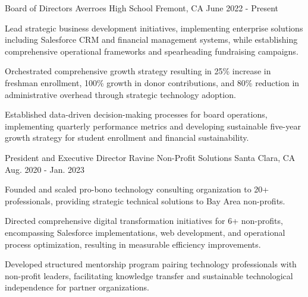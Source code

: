 

\begin{cventries}

  \cventry
  {Board of Directors} %
  {Averroes High School} %
  {Fremont, CA} %
  {June 2022 - Present} %
  {
    \begin{cvitems} %
      \item {Lead strategic business development initiatives, implementing enterprise solutions including Salesforce CRM and financial management systems, while establishing comprehensive operational frameworks and spearheading fundraising campaigns.}
      \item {Orchestrated comprehensive growth strategy resulting in 25\% increase in freshman enrollment, 100\% growth in donor contributions, and 80\% reduction in administrative overhead through strategic technology adoption.}
      \item {Established data-driven decision-making processes for board operations, implementing quarterly performance metrics and developing sustainable five-year growth strategy for student enrollment and financial sustainability.}
    \end{cvitems}
  }

  \cventry
    {President and Executive Director} %
    {Ravine Non-Profit Solutions} %
    {Santa Clara, CA} %
    {Aug. 2020 - Jan. 2023} %
    {
      \begin{cvitems} %
        \item {Founded and scaled pro-bono technology consulting organization to 20+ professionals, providing strategic technical solutions to Bay Area non-profits.}
        \item {Directed comprehensive digital transformation initiatives for 6+ non-profits, encompassing Salesforce implementations, web development, and operational process optimization, resulting in measurable efficiency improvements.}
        \item {Developed structured mentorship program pairing technology professionals with non-profit leaders, facilitating knowledge transfer and sustainable technological independence for partner organizations.}
      \end{cvitems}
    }

\end{cventries}
